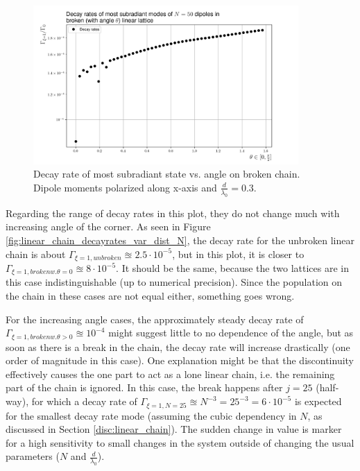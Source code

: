 \documentclass{article}
\begin{document}
\begin{figure}[H]
    \includegraphics[width=0.9\textwidth]{figs/case_linear_broken_rates.png}
    \caption{Decay rate of most subradiant state vs. angle on broken chain. Dipole moments polarized along x-axis and $\frac{d}{\lambda_0} = 0.3$. }
    \label{fig:linear_broken_rates}
\end{figure}
Regarding the range of decay rates in this plot, they do not change much with increasing angle of the corner. As seen in Figure \ref{fig:linear_chain_decayrates_var_dist_N}, the decay rate for the unbroken linear chain is about $\Gamma_{\xi=1, unbroken} \approxeq 2.5 \cdot 10^{-5}$, but in this plot, it is closer to $\Gamma_{\xi=1, broken w. \theta = 0} \approxeq 8 \cdot 10^{-5}$. It should be the same, because the two lattices are in this case indistinguishable (up to numerical precision). Since the population on the chain in these cases are not equal either, something goes wrong. 

For the increasing angle cases, the approximately steady decay rate of $\Gamma_{\xi = 1, broken w. \theta > 0} \approxeq 10^{-4}$ might suggest little to no dependence of the angle, but as soon as there is a break in the chain, the decay rate will increase drastically (one order of magnitude in this case). One explanation might be that the discontinuity effectively causes the one part to act as a lone linear chain, i.e. the remaining part of the chain is ignored. In this case, the break happens after $j=25$ (half-way), for which a decay rate of $\Gamma_{\xi=1, N=25} \approxeq N^{-3} = 25^{-3} = 6 \cdot 10^{-5}$ is expected for the smallest decay rate mode (assuming the cubic dependency in $N$, as discussed in Section \ref{disc:linear_chain}). The sudden change in value is marker for a high sensitivity to small changes in the system outside of changing the usual parameters ($N$ and $\frac{d}{\lambda_0}$). 
\end{document}
